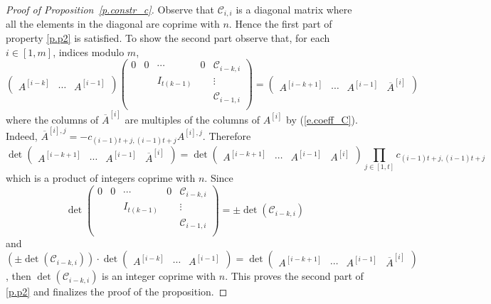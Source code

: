 \documentclass[10pt]{article}
\begin{document}
\begin{proof}[Proof of Proposition~\ref{p.constr_c}]
Observe that $\mathcal{C}_{i,i}$ is a diagonal matrix where all the elements in the diagonal are coprime with $n$. Hence the first part of property \ref{p.p2} is satisfied. To show the second part observe that, for each $i\in[1,m]$, indices modulo $m$,
\begin{displaymath}
\begin{pmatrix}
	A^{[i-k]} & \cdots & A^{[i-1]}
\end{pmatrix} 
	\begin{pmatrix}
		0 & 0 & \cdots & 0 & \mathcal{C}_{i-k,i} \\
	 &  & I_{t(k-1)} &  & \vdots \\
		 &  &  &  & \mathcal{C}_{i-1,i} \\
\end{pmatrix}
= 
\begin{pmatrix}
	A^{[i-k+1]} & \cdots & A^{[i-1]} & \overline{A}^{[i]} 
\end{pmatrix}
\end{displaymath}
where the columns of $\overline{A}^{[i]}$ are multiples of the columns of $A^{[i]}$ by (\ref{e.coeff_C}). Indeed, $\overline{A}^{[i],j}= -c_{(i-1)t+j,(i-1)t+j} A^{[i],j}$. Therefore
\begin{displaymath}
\det\begin{pmatrix}
		A^{[i-k+1]} & \cdots & A^{[i-1]} & \overline{A}^{[i]} 
	\end{pmatrix}
	=
	\det\begin{pmatrix}A^{[i-k+1]} & \cdots & A^{[i-1]} & A^{[i]}\end{pmatrix} \prod_{j\in[1,t]}c_{(i-1)t+j,(i-1)t+j}
\end{displaymath}
which is a product of integers coprime with $n$. 
Since
\begin{displaymath}
		\det 	\begin{pmatrix}
				0 & 0 & \cdots & 0 & \mathcal{C}_{i-k,i} \\
			 &  & I_{t(k-1)} &  & \vdots \\
				 &  &  &  & \mathcal{C}_{i-1,i} \\
		\end{pmatrix}= \pm\det(\mathcal{C}_{i-k,i})
\end{displaymath}
and $(\pm\det(\mathcal{C}_{i-k,i}))\cdot \det\begin{pmatrix}
	A^{[i-k]} & \cdots & A^{[i-1]}
\end{pmatrix} =\det\begin{pmatrix}
		A^{[i-k+1]} & \cdots & A^{[i-1]} & \overline{A}^{[i]} 
	\end{pmatrix}$, then $\det(\mathcal{C}_{i-k,i})$
is an integer coprime with $n$. This proves the second part of \ref{p.p2} and finalizes the proof of the proposition.
\end{proof}
\end{document}
